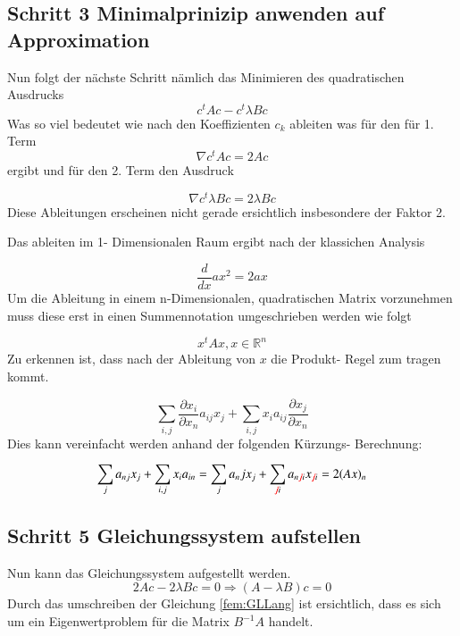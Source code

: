 \subsection{Schritt 3 Minimalprinizip anwenden auf Approximation}

Nun folgt der nächste Schritt nämlich das Minimieren des quadratischen Ausdrucks
\begin{equation}
	c^t Ac - c^t \lambda Bc
\end{equation}
Was so viel bedeutet wie nach den Koeffizienten $c_k$ ableiten was für den  für 1. Term
\begin{equation}
	\nabla c^t Ac = 2Ac
\end{equation}
ergibt und für den 2. Term den Ausdruck

\begin{equation}
	\nabla c^t \lambda Bc = 2\lambda Bc
\end{equation}
Diese Ableitungen erscheinen nicht gerade ersichtlich insbesondere der Faktor 2. 

Das ableiten im 1- Dimensionalen Raum ergibt nach der klassichen Analysis

\begin{equation}
	\frac{d}{dx} ax^2 = 2ax
\end{equation}
Um die Ableitung in einem n-Dimensionalen, quadratischen Matrix vorzunehmen muss diese erst in einen Summennotation umgeschrieben werden wie folgt

\begin{equation}
			x^tAx, x \in \mathbb{R}^n
\end{equation}
Zu erkennen ist, dass nach der Ableitung von $x$ die Produkt- Regel zum tragen kommt. 

\begin{equation}
	\sum_{i,j} \frac{\partial x_i}{\partial x_n} a_{ij} x_j + \sum_{i,j} x_i a_{ij} \frac{\partial x_j}{\partial x_n}
\end{equation}
Dies kann vereinfacht werden anhand der folgenden Kürzungs- Berechnung:

\begin{equation}
	\sum_{j} a_{nj} x_j + \sum_{i,j} x_i a_{in} = \sum_{j} a_nj x_j + \sum_{\textcolor{red}{\not{j}} i} a_{n \textcolor{red}{\not{j}} i} x_{\textcolor{red}{\not{j}} i} = 2(Ax)_n
\end{equation}

\subsection{Schritt 5 Gleichungssystem aufstellen}
Nun kann das Gleichungssystem aufgestellt werden.
\begin{equation}
	2Ac - 2\lambda Bc = 0 \Rightarrow (A-\lambda B)c = 0
	\label{fem:GLLang}
\end{equation}
Durch das umschreiben der Gleichung \ref{fem:GLLang} ist ersichtlich, dass es sich um ein Eigenwertproblem für die Matrix $B^{-1}A$ handelt.

